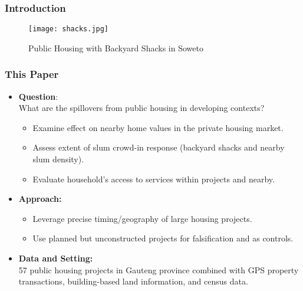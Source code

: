 \documentclass[aspectratio=149]{beamer}
\begin{document}

\begin{frame}
\frametitle{Introduction}
\centering

\begin{figure}
 \texttt{[image: shacks.jpg]} 
 \caption{Public Housing with Backyard Shacks in Soweto}
\end{figure}

\end{frame}


\begin{frame}
\frametitle{This Paper}

\centering

\begin{itemize}
  \item<1-> \textbf{Question}: \\ 
  \vspace{.2cm}
  {What are the spillovers from public housing in developing contexts?}
  \vspace{.2cm}
    \begin{itemize}
      \item<2-> Examine effect on nearby home values in the private housing market. 
      \vspace{1mm}
      \item<3-> Assess extent of slum crowd-in response (backyard shacks and nearby slum density).
      \vspace{1mm}
      \item<4-> Evaluate household's access to services within projects and nearby.
    \end{itemize}
\vspace{.2cm}
\item<5-> \textbf{Approach:} 
\vspace{1mm}
\begin{itemize}
      \item Leverage precise timing/geography of large housing projects.
      \vspace{1mm}
      \item Use planned but unconstructed projects for falsification and as controls.
    \end{itemize}
\vspace{.2cm}
\item<6-> \textbf{Data and Setting:} \\
\vspace{.1cm} 
{\small 57 public housing projects in Gauteng province combined with GPS property transactions, building-based land information, and census data.}
\end{itemize}

\end{frame}
\end{document}
